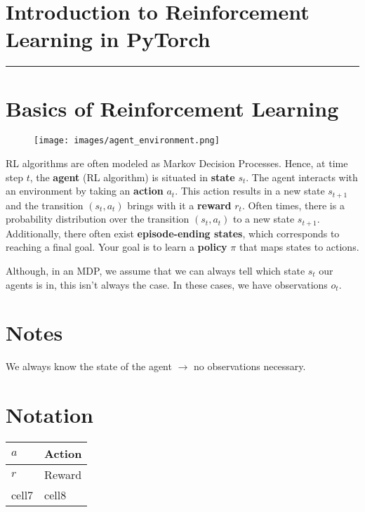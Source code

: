 \documentclass[12pt,letterpaper, onecolumn]{exam}
\newcommand{\highlight}[1]{\textbf{\textcolor{highlight_color}{#1}}}
\begin{document}
\section*{Introduction to Reinforcement Learning in PyTorch\cite{medium}}
\rule{\textwidth}{0.4pt}

\section{Basics of Reinforcement Learning}
\begin{figure}[h]
    \centering
    \caption{\cite{agent_env}}
    \texttt{[image: images/agent\_environment.png]}
\end{figure}
RL algorithms are often modeled as Markov Decision Processes. Hence, at time step $t$, the \highlight{agent} (RL algorithm) is situated in \highlight{state} $s_t$. The agent interacts with an environment by taking an \highlight{action} $a_t$. This action results in a new state $s_{t+1}$ and the transition $(s_t, a_t)$ brings with it a \highlight{reward} $r_t$.
Often times, there is a probability distribution over the transition $(s_t, a_t)$ to a new state $s_{t+1}$. Additionally, there often exist \highlight{episode-ending states}, which corresponds to reaching a final goal. Your goal is to learn a \highlight{policy} $\pi$ that maps states to actions.

Although, in an MDP, we assume that we can always tell which state $s_t$ our agents is in, this isn't always the case. In these cases, we have observations $o_t$.

\section{Notes}
We always know the state of the agent $\rightarrow$ no observations necessary.

\newpage
\section{Notation}
\begin{center}
    \begin{tabular}{ | m{2em} | m{2cm}| } 
      \hline
      $a$ & Action \\ 
      \hline
      $r$ & Reward \\ 
      \hline
      cell7 & cell8 \\
      \hline
    \end{tabular}
    \end{center}
\end{document}
